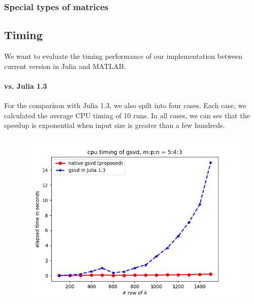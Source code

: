     \subsubsection{Special types of matrices}
        
    \newpage
    \subsection{Timing}
        We want to evaluate the timing performance of our implementation between current version in Julia and MATLAB. 
        
        \paragraph{vs. Julia 1.3}
        For the comparison with Julia 1.3, we also spilt into four cases. Each case, we calculated the average CPU timing of 10 runs. In all cases, we can see that the speedup is exponential when input size is greater than a few hundreds. 
        
        \begin{figure}[H]
            \centering
            \begin{minipage}{.65\textwidth}
              \centering
              \includegraphics[width=\linewidth]{fig/m p n 5 4 3.png}
            \end{minipage}%
        \end{figure}
        
